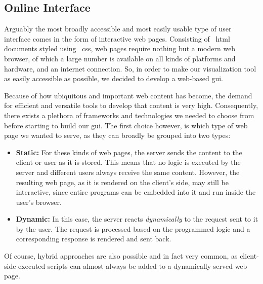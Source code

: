 \documentclass[\relativeRoot/main.tex]{subfiles}
\begin{document}
\subsection*{Online Interface}
\label{subsec:lyprox:motivation:online}

Arguably the most broadly accessible and most easily usable type of user interface comes in the form of interactive web pages. Consisting of ~\acrshort{html} documents styled using ~\acrshort{css}, web pages require nothing but a modern web browser, of which a large number is available on all kinds of platforms and hardware, and an internet connection. So, in order to make our visualization tool as easily accessible as possible, we decided to develop a web-based \gls{gui}.

Because of how ubiquitous and important web content has become, the demand for efficient and versatile tools to develop that content is very high. Consequently, there exists a plethora of frameworks and technologies we needed to choose from before starting to build our \gls{gui}. The first choice however, is which type of web page we wanted to serve, as they can broadly be grouped into two types:

\begin{itemize}
    \item \textbf{Static:} For these kinds of web pages, the server sends the content to the client or user as it is stored. This means that no logic is executed by the server and different users always receive the same content. However, the resulting web page, as it is rendered on the client's side, may still be interactive, since entire programs can be embedded into it and run inside the user's browser.
    \item \textbf{Dynamic:} In this case, the server reacts \emph{dynamically} to the request sent to it by the user. The request is processed based on the programmed logic and a corresponding response is rendered and sent back.
\end{itemize}

Of course, hybrid approaches are also possible and in fact very common, as client-side executed scripts can almost always be added to a dynamically served web page. 
\end{document}
